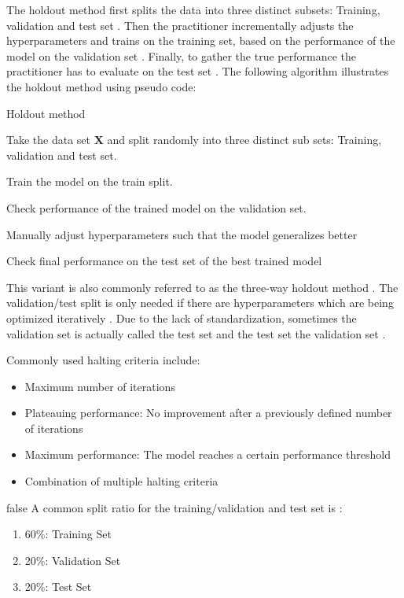 \documentclass[draft,final,oneside]{vutinfth} %
\begin{document}
The holdout method first splits the data into three distinct subsets: Training, validation and test set \cite{holdoutcrossvalidation}. Then the practitioner incrementally adjusts the hyperparameters and trains on the training set, based on the performance of the model on the validation set \cite{holdoutcrossvalidation}. Finally, to gather the true performance the practitioner has to evaluate on the test set \cite{holdoutcrossvalidation}. The following algorithm illustrates the holdout method using pseudo code:

\begin{algorithm}
\caption{Holdout method \cite{holdoutcrossvalidation}}\label{holdoutalgo}
Take the data set $\boldsymbol{X}$ and split randomly into three distinct sub sets: Training, validation and test set.

 {
Train the model on the train split.

Check performance of the trained model on the validation set.

Manually adjust hyperparameters such that the model generalizes better
}

Check final performance on the test set of the best trained model

\end{algorithm}

This variant is also commonly referred to as the three-way holdout method \cite{holdoutcrossvalidation}. The validation/test split is only needed if there are hyperparameters which are being optimized iteratively \cite{holdoutcrossvalidation}.
Due to the lack of standardization, sometimes the validation set is actually called the test set and the test set the validation set \cite{patternrecognitionandnn} \cite{anintroductiontoneuralnetworks}.

Commonly used halting criteria include:
\begin{itemize}
\item Maximum number of iterations \cite{kerashalting}
\item Plateauing performance: No improvement after a previously defined number of iterations \cite{haltingcriteria}
\item Maximum performance: The model reaches a certain performance threshold \cite{kerashalting}
\item Combination of multiple halting criteria \cite{kerashalting}
\end{itemize}

\if false
A common split ratio for the training/validation and test set is \cite{holdoutcrossvalidation}:
\begin{enumerate}
\item 60\%: Training Set
\item 20\%: Validation Set
\item 20\%: Test Set
\end{enumerate}
\fi
\end{document}
